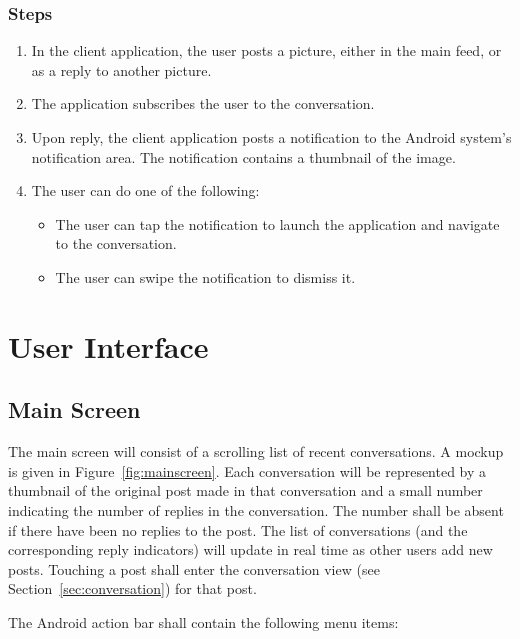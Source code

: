 \documentclass[11pt]{scrartcl}
\let\stdsection\section
\renewcommand\section{\newpage\stdsection}
\begin{document}
        \subsubsection{Steps}
            \begin{enumerate}
                \item In the client application, the user posts a picture, either in the main feed, or as a reply to another picture.
                \item The application subscribes the user to the conversation.
                \item Upon reply, the client application posts a notification to the Android system's notification area.  The notification contains a thumbnail of the image.
                \item The user can do one of the following:
                \begin{itemize}
                    \item The user can tap the notification to launch the application and navigate to the conversation.
                    \item The user can swipe the notification to dismiss it.
                \end{itemize}
            \end{enumerate}

\appendix

\section{User Interface}
    \subsection{Main Screen}
        The main screen will consist of a scrolling list of recent conversations.
        A mockup is given in Figure~\ref{fig:mainscreen}.
        Each conversation will be represented by a thumbnail of the original post made in that conversation and a small number indicating the number of replies in the conversation.
        The number shall be absent if there have been no replies to the post.
        The list of conversations (and the corresponding reply indicators) will update in real time as other users add new posts.
        Touching a post shall enter the conversation view (see Section~\ref{sec:conversation}) for that post.

        The Android action bar shall contain the following menu items:
\end{document}
